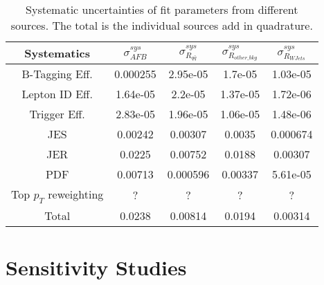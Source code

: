 \documentclass{cmspaperpdf}
\begin{document}
\begin{table}[htb]
\centering
\label{tab:sys-err}
\begin{tabular}{ccccc}
Systematics &    $\sigma_{AFB}^{sys}$ & $\sigma_{R_{q\bar{q}}}^{sys}$ & $\sigma_{R_{other\_bkg}}^{sys}$ & $\sigma_{R_{WJets}}^{sys}$ \\
\hline
B-Tagging Eff. &    0.000255 &     2.95e-05 &             1.7e-05 &        1.03e-05 \\
Lepton ID Eff.   &    1.64e-05 &      2.2e-05 &            1.37e-05 &        1.72e-06 \\
Trigger Eff.  &    2.83e-05 &     1.96e-05 &            1.06e-05 &        1.48e-06 \\
JES               &     0.00242 &      0.00307 &              0.0035 &        0.000674 \\
JER               &      0.0225 &      0.00752 &              0.0188 &         0.00307 \\
PDF       &     0.00713 &     0.000596 &             0.00337 &        5.61e-05 \\ 
Top $p_T$ reweighting &   ? &  ?  &      ?  &  ?   \\ \hline
Total         &      0.0238 &      0.00814 &              0.0194 &         0.00314 \\
\hline
\end{tabular}
\caption{Systematic uncertainties of fit parameters from different sources. The total is the individual sources add in quadrature. }
\end{table}




\section{Sensitivity Studies}
\end{document}
